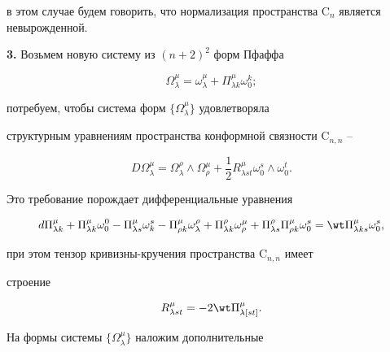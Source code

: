 в этом случае будем говорить, что нормализация пространства $\mathrm 


C_n$ является невырожденной. 


\medskip 


 


{\bf 3.} Возьмем новую систему из $(n+2)^2$ форм Пфаффа 


\begin{equation} 


\Omega^\mu_\lambda=\omega^\mu_\lambda+\Pi^\mu_{\lambda k} 


\omega^k_0; 


\end{equation} 


потребуем, чтобы система форм $\{\Omega^\mu_\lambda\}$ удовлетворяла 


структурным уравнениям пространства конформной связности $\mathrm 


C_{n,n}$ \cite{6}--\cite{8}


$$ 


D\Omega^\mu_\lambda=\Omega^\rho_\lambda\wedge\Omega^\mu_\rho+ 


\frac{1}{2}R^\mu_{\lambda s t}\omega^s_0\wedge\omega^t_0. 


$$ 


Это требование порождает дифференциальные уравнения 


\begin{equation} 


d\Pi^\mu_{\lambda k}+\Pi^\mu_{\lambda k}\omega^0_0- 


\Pi^\mu_{\lambda s}\omega^s_k-\Pi^\mu_{\rho k}\omega^\rho_\lambda+ 


\Pi^\rho_{\lambda k}\omega^\mu_\rho+\Pi^\rho_{\lambda s} 


\Pi^\mu_{\rho k}\omega^s_0=\wt\Pi^\mu_{\lambda k s}\omega^s_0, 


\end{equation} 


при этом тензор кривизны-кручения пространства $\mathrm C_{n,n}$ имеет 


строение 


$$ 


R^\mu_{\lambda s t}=-2\wt\Pi^\mu_{\lambda[s t]}. 


$$ 


 


На формы системы $\{\Omega^\mu_\lambda\}$ наложим дополнительные 


